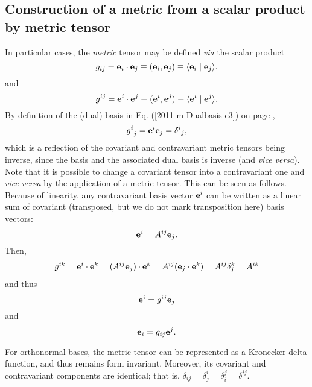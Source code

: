 \subsection{Construction of a metric from a scalar product by metric tensor}

In particular cases, the {\em metric} tensor may be defined {\it via}  the scalar product
\begin{equation}
g_{ij}={\bf e}_i\cdot {\bf e}_j\equiv ({\bf e}_i, {\bf e}_j)\equiv \langle {\bf e}_i \mid {\bf e}_j\rangle .
\end{equation}
and
\begin{equation}
g^{ij}={\bf e}^i\cdot {\bf e}^j\equiv ({\bf e}^i, {\bf e}^j)\equiv \langle {\bf e}^i \mid {\bf e}^j\rangle .
\end{equation}
By definition of the (dual) basis in Eq. (\ref{2011-m-Dualbasis-e3}) on page \pageref{2011-m-Dualbasis-e3},
\begin{equation}
{g^i}_{j}
= {\bf e}^i  {\bf e}_j
={\delta^i}_j ,
\label{2014-m-ch-tensor-deltag}
\end{equation}
which is a reflection of the covariant and contravariant metric tensors being inverse,
since the basis and the associated dual basis is inverse (and {\it vice versa}).
Note that it is possible to change a covariant tensor into a contravariant one and {\em vice versa}
by the application of a metric tensor.
This can be seen as follows.
Because of linearity, any contravariant basis vector ${\bf e}^i$
can be written as a linear sum of covariant (transposed, but we do not mark transposition here) basis vectors:
\begin{equation}
{\bf e}^i=A^{ij}{\bf e}_j.
\end{equation}
Then,
\begin{equation}
g^{ik} ={\bf e}^i\cdot {\bf e}^k =(A^{ij}{\bf e}_j)\cdot {\bf e}^k=A^{ij}({\bf e}_j\cdot {\bf e}^k)=A^{ij}\delta_j^k=A^{ik}
\end{equation}
and thus
\begin{equation}
{\bf e}^i=g^{ij}{\bf e}_j
\end{equation}
and
\begin{equation}
{\bf e}_i=g_{ij}{\bf e}^j.
\end{equation}


For orthonormal bases, the metric tensor can be
represented as a Kronecker delta function, and thus  remains form invariant.
Moreover, its covariant and contravariant components are identical; that is,
$\delta_{ij}=\delta^i_j=\delta_i^j=\delta^{ij}$.



